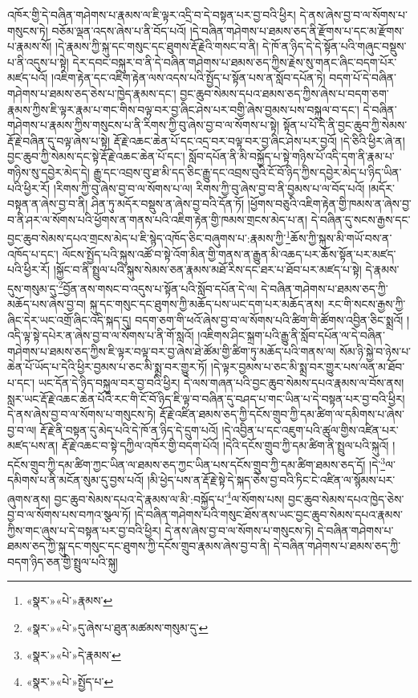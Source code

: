 འཁོར་གྱི་དེ་བཞིན་གཤེགས་པ་རྣམས་ལ་ཇི་ལྟར་འདྲི་བ་དེ་བསྟན་པར་བྱ་བའི་ཕྱིར། དེ་ནས་ཞེས་བྱ་བ་ལ་སོགས་པ་གསུངས་ཏེ། བཅོམ་ལྡན་འདས་ཞེས་པ་ནི་བོད་པའོ། །དེ་བཞིན་གཤེགས་པ་ཐམས་ཅད་ནི་རྫོགས་པ་དང་མ་རྫོགས་པ་རྣམས་སོ། །དེ་རྣམས་ཀྱི་སྐུ་དང་གསུང་དང་ཐུགས་རྡོ་རྗེའི་གསང་བ་ནི། དེ་ཁོ་ན་ཉིད་དེ་དེ་སྟོན་པའི་གཞུང་བསྡུས་པ་ནི་འདུས་པ་སྟེ། དེར་དབང་བསྐུར་བ་ནི་དེ་བཞིན་གཤེགས་པ་ཐམས་ཅད་ཀྱིས་རྗེས་སུ་གནང་ཞིང་བདག་པོར་མཛད་པའོ། །འཇིག་རྟེན་དང་འཇིག་རྟེན་ལས་འདས་པའི་སྤྱོད་པ་སྟོན་པས་ན་སློབ་དཔོན་ཏེ། བདག་པོ་དེ་བཞིན་གཤེགས་པ་ཐམས་ཅད་ཅེས་པ་ཁྱེད་རྣམས་དང་། བྱང་ཆུབ་སེམས་དཔའ་ཐམས་ཅད་ཀྱིས་ཞེས་པ་བདག་ཅག་རྣམས་ཀྱིས་ཇི་ལྟར་རྣམ་པ་གང་གིས་བལྟ་བར་བྱ་ཞིང་ཤེས་པར་བགྱི་ཞེས་བྱམས་པས་བསྐུལ་བ་དང་། དེ་བཞིན་གཤེགས་པ་རྣམས་ཀྱིས་གསུངས་པ་ནི་རིགས་ཀྱི་བུ་ཞེས་བྱ་བ་ལ་སོགས་པ་སྟེ། སྟོན་པ་པོ་དེ་ནི་བྱང་ཆུབ་ཀྱི་སེམས་རྡོ་རྗེ་བཞིན་དུ་བལྟ་ཞེས་པ་སྟེ། རྡོ་རྗེ་འཆང་ཆེན་པོ་དང་འདྲ་བར་བལྟ་བར་བྱ་ཞིང་ཤེས་པར་བྱའོ། །དེ་ཅིའི་ཕྱིར་ཞེ་ན། བྱང་ཆུབ་ཀྱི་སེམས་དང་སྟེ་རྡོ་རྗེ་འཆང་ཆེན་པོ་དང་། སློབ་དཔོན་ནི་མི་བསྐྱོད་པ་སྟེ་གཉིས་པོ་འདི་དག་ནི་རྣམ་པ་གཉིས་སུ་དབྱེར་མེད་དེ། རྒྱུ་དང་འབྲས་བུ་ཐ་མི་དད་ཅིང་རྒྱུ་དང་འབྲས་བུའི་ངོ་བོ་ཉིད་ཀྱིས་དབྱེར་མེད་པ་ཉིད་ཡིན་པའི་ཕྱིར་རོ། །རིགས་ཀྱི་བུ་ཞེས་བྱ་བ་ལ་སོགས་པ་ལ། རིགས་ཀྱི་བུ་ཞེས་བྱ་བ་ནི་བྱམས་པ་ལ་བོད་པའོ། །མདོར་བསྟན་ན་ཞེས་བྱ་བ་ནི། ཤིན་ཏུ་མདོར་བསྡུས་ན་ཞེས་བྱ་བའི་དོན་ཏོ། །ཕྱོགས་བཅུའི་འཇིག་རྟེན་གྱི་ཁམས་ན་ཞེས་བྱ་བ་ནི་ཤར་ལ་སོགས་པའི་ཕྱོགས་ན་གནས་པའི་འཇིག་རྟེན་གྱི་ཁམས་གྲངས་མེད་པ་ན། དེ་བཞིན་དུ་སངས་རྒྱས་དང་བྱང་ཆུབ་སེམས་དཔའ་གྲངས་མེད་པ་ཇི་སྙེད་འཁོད་ཅིང་བཞུགས་པ་:རྣམས་ཀྱི་\footnote{«སྣར་»«པེ་»རྣམས་}ཆོས་ཀྱི་སྐུས་མི་གཡོ་བས་ན་འཁོད་པ་དང་། ལོངས་སྤྱོད་པའི་སྐུས་འཚོ་བ་སྟེ་འོག་མིན་གྱི་གནས་ན་རྒྱུན་མི་འཆད་པར་ཆོས་སྟོན་པར་མཛད་པའི་ཕྱིར་རོ། །སྐྱོང་བ་ནི་སྤྲུལ་པའི་སྐུས་སེམས་ཅན་རྣམས་མཐོ་རིས་དང་ཐར་པ་ཐོབ་པར་མཛད་པ་སྟེ། དེ་རྣམས་དུས་གསུམ་དུ་\footnote{«སྣར་»«པེ་»དུ་ཞེས་པ་ཐུན་མཚམས་གསུམ་དུ་}བྱོན་ནས་གསང་བ་འདུས་པ་སྟོན་པའི་སློབ་དཔོན་དེ་ལ། དེ་བཞིན་གཤེགས་པ་ཐམས་ཅད་ཀྱི་མཆོད་པས་ཞེས་བྱ་བ། སྐུ་དང་གསུང་དང་ཐུགས་ཀྱི་མཆོད་པས་ཡང་དག་པར་མཆོད་ནས། རང་གི་སངས་རྒྱས་ཀྱི་ཞིང་དེར་ཡང་འགྲོ་ཞིང་འདི་སྐད་དུ། བདག་ཅག་གི་ཕའོ་ཞེས་བྱ་བ་ལ་སོགས་པའི་ཚིག་གི་ཚོགས་འབྱིན་ཅིང་སྨྲའོ། །འདི་ལྟ་སྟེ་དཔེར་ན་ཞེས་བྱ་བ་ལ་སོགས་པ་ནི་གོ་སླའོ། །འཇིགས་ཤིང་སྐྲག་པའི་རྒྱུ་ནི་སློབ་དཔོན་ལ་དེ་བཞིན་གཤེགས་པ་ཐམས་ཅད་ཀྱིས་ཇི་ལྟར་བལྟ་བར་བྱ་ཞེས་ཐེ་ཚོམ་གྱི་ཚིག་ཏུ་མཆོད་པའི་གནས་ལ། སོམ་ཉི་སྐྱེ་བ་ཉེས་པ་ཆེན་པོ་ཡོད་པ་དེའི་ཕྱིར་བྱམས་པ་ཅང་མི་སྨྲ་བར་གྱུར་ཏོ། །དེ་ལྟར་བྱམས་པ་ཅང་མི་སྨྲ་བར་གྱུར་པས་ལན་མ་ཐོབ་པ་དང་། ཡང་དོན་དེ་ཉིད་བསྐུལ་བར་བྱ་བའི་ཕྱིར། དེ་ལས་གཞན་པའི་བྱང་ཆུབ་སེམས་དཔའ་རྣམས་ལ་བོས་ནས། སླར་ཡང་རྡོ་རྗེ་འཆང་ཆེན་པོའི་རང་གི་ངོ་བོ་ཉིད་ཇི་ལྟ་བ་བཞིན་དུ་བཤད་པ་གང་ཡིན་པ་དེ་བསྟན་པར་བྱ་བའི་ཕྱིར། དེ་ནས་ཞེས་བྱ་བ་ལ་སོགས་པ་གསུངས་ཏེ། རྡོ་རྗེ་འཛིན་ཐམས་ཅད་ཀྱི་དངོས་གྲུབ་ཀྱི་དམ་ཚིག་ལ་དམིགས་པ་ཞེས་བྱ་བ་ལ། རྡོ་རྗེ་ནི་བསྟན་དུ་མེད་པའི་དེ་ཁོ་ན་ཉིད་དེ་དྲུག་པའོ། །དེ་འབྱིན་པ་དང་འཇུག་པའི་ཚུལ་གྱིས་འཛིན་པར་མཛད་པས་ན། རྡོ་རྗེ་འཆང་བ་སྟེ་དཀྱིལ་འཁོར་གྱི་བདག་པོའོ། །དེའི་དངོས་གྲུབ་ཀྱི་དམ་ཚིག་ནི་སྤྲུལ་པའི་སྐུའོ། །དངོས་གྲུབ་ཀྱི་དམ་ཚིག་ཀྱང་ཡིན་ལ་ཐམས་ཅད་ཀྱང་ཡིན་པས་དངོས་གྲུབ་ཀྱི་དམ་ཚིག་ཐམས་ཅད་དོ། །དེ་\footnote{«སྣར་»«པེ་»དེ་རྣམས་}ལ་དམིགས་པ་ནི་མངོན་སུམ་དུ་བྱས་པའོ། །མི་ཕྱེད་པས་ན་རྡོ་རྗེ་སྟེ་དེ་སྐད་ཅེས་བྱ་བའི་ཏིང་ངེ་འཛིན་ལ་སྙོམས་པར་ཞུགས་ནས། བྱང་ཆུབ་སེམས་དཔའ་དེ་རྣམས་ལ་མི་:བསྐྱོད་པ་\footnote{«སྣར་»«པེ་»སྤྱོད་པ་}ལ་སོགས་པས། བྱང་ཆུབ་སེམས་དཔའ་ཁྱེད་ཅེས་བྱ་བ་ལ་སོགས་པས་བཀའ་སྩལ་ཏོ། །དེ་བཞིན་གཤེགས་པའི་གསུང་ཐོས་ནས་ཡང་བྱང་ཆུབ་སེམས་དཔའ་རྣམས་ཀྱིས་གང་ཞུས་པ་དེ་བསྟན་པར་བྱ་བའི་ཕྱིར། དེ་ནས་ཞེས་བྱ་བ་ལ་སོགས་པ་གསུངས་ཏེ། དེ་བཞིན་གཤེགས་པ་ཐམས་ཅད་ཀྱི་སྐུ་དང་གསུང་དང་ཐུགས་ཀྱི་དངོས་གྲུབ་རྣམས་ཞེས་བྱ་བ་ནི། དེ་བཞིན་གཤེགས་པ་ཐམས་ཅད་ཀྱི་བདག་ཉིད་ཅན་གྱི་སྤྲུལ་པའི་སྐུ། 
